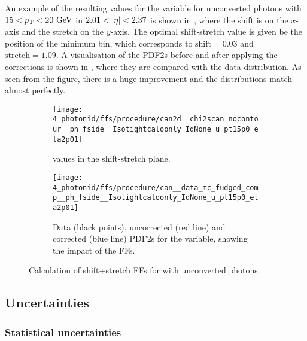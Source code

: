 An example of the resulting \chisq values for the \fside variable for unconverted photons with \(15<p_{\text{T}}<20~\text{GeV}\) in \(2.01<\abseta<2.37\) is shown in \Fig{\ref{fig:ss_corrections:ffs:calculation:fside_calculation:chi2}}, where the shift is on the \(x\)-axis and the stretch on the \(y\)-axis. The optimal shift-stretch value is given be the position of the minimum bin, which corresponds to \(\text{shift}=0.03\) and \(\text{stretch}=1.09\). A visualisation of the \acp{PDF2} before and after applying the corrections is shown in \Fig{\ref{fig:ss_corrections:ffs:calculation:fside_calculation:pdfs}}, where they are compared with the data distribution. As seen from the figure, there is a huge improvement and the distributions match almost perfectly.

\begin{figure}[ht!]
    \centering
    \begin{subfigure}[t]{0.49\linewidth}
        \centering
        \texttt{[image: 4\_photonid/ffs/procedure/can2d\_\_chi2scan\_nocontour\_\_ph\_fside\_\_Isotightcaloonly\_IdNone\_u\_pt15p0\_eta2p01]}
        \caption{\chisq values in the shift-stretch plane.}
        \label{fig:ss_corrections:ffs:calculation:fside_calculation:chi2}
    \end{subfigure}
    \hfill
    \begin{subfigure}[t]{0.49\linewidth}
        \centering
        \texttt{[image: 4\_photonid/ffs/procedure/can\_\_data\_mc\_fudged\_comp\_\_ph\_fside\_\_Isotightcaloonly\_IdNone\_u\_pt15p0\_eta2p01]}
        \caption{Data (black points), uncorrected (red line) and corrected (blue line) \acp{PDF2} for the \fside variable, showing the impact of the \acp{FF}.}
        \label{fig:ss_corrections:ffs:calculation:fside_calculation:pdfs}
    \end{subfigure}
    \caption{Calculation of shift+stretch \acp{FF} for \fside with unconverted photons.}
    \label{fig:ss_corrections:ffs:calculation:fside_calculation}
\end{figure}







\subsection{Uncertainties}
\label{subsec:ss_corrections:ffs:uncs}

\subsubsection{Statistical uncertainties}


